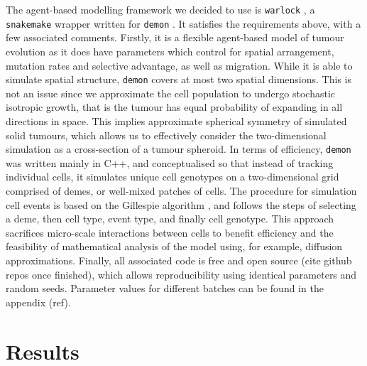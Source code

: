 The agent-based modelling framework we decided to use is \texttt{warlock} \cite{bak_warlock_2023}, a \texttt{snakemake} wrapper written for \texttt{demon} \cite{noble_demon_2020}. It satisfies the requirements above, with a few associated comments. Firstly, it is a flexible agent-based model of tumour evolution as it does have parameters which control for spatial arrangement, mutation rates and selective advantage, as well as migration. While it is able to simulate spatial structure, \texttt{demon} covers at most two spatial dimensions. This is not an issue since we approximate the cell population to undergo stochastic isotropic growth, that is the tumour has equal probability of expanding in all directions in space. This implies approximate spherical symmetry of simulated solid tumours, which allows us to effectively consider the two-dimensional simulation as a cross-section of a tumour spheroid. In terms of efficiency, \texttt{demon} was written mainly in C++, and conceptualised so that instead of tracking individual cells, it simulates unique cell genotypes on a two-dimensional grid comprised of demes, or well-mixed patches of cells. The procedure for simulation cell events is based on the Gillespie algorithm \cite{gillespie_exact_1977}, and follows the steps of selecting a deme, then cell type, event type, and finally cell genotype. This approach sacrifices micro-scale interactions between cells to benefit efficiency and the feasibility of mathematical analysis of the model using, for example, diffusion approximations. Finally, all associated code is free and open source (cite github repos once finished), which allows reproducibility using identical parameters and random seeds. Parameter values for different batches can be found in the appendix (ref).


\section{Results}
